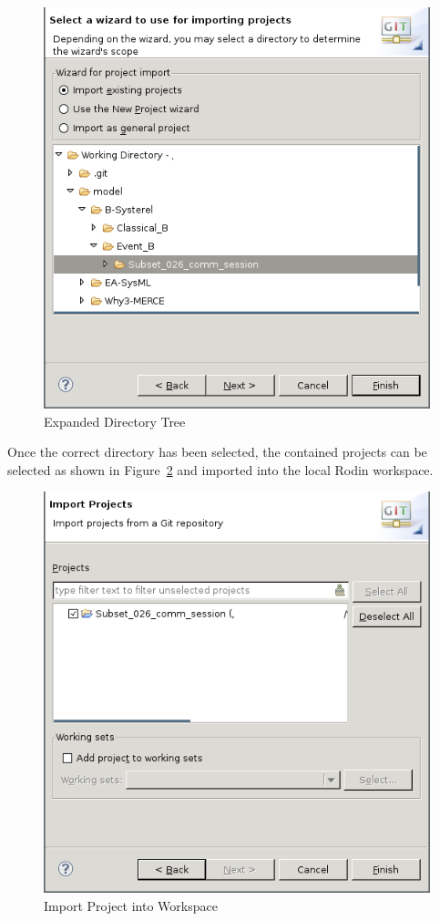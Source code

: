 \documentclass{template/openetcs_article}
\begin{document}
\begin{figure}[H]
  \centering
  \includegraphics[width=\skalierung\textwidth]{project_import_step7}
  \caption{Expanded Directory Tree}
  \label{fig:expanded-tree}
\end{figure}

Once the correct directory has been selected, the contained projects can be
selected as shown in Figure~\ref{fig:import-project-workspace} and imported into
the local Rodin workspace.

\begin{figure}[H]
  \centering
  \includegraphics[width=\skalierung\textwidth]{project_import_step8}
  \caption{Import Project into Workspace}
  \label{fig:import-project-workspace}
\end{figure}
\end{document}

